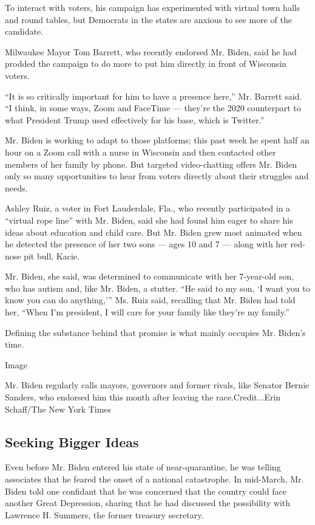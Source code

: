 To interact with voters, his campaign has experimented with virtual town
halls and round tables, but Democrats in the states are anxious to see
more of the candidate.

Milwaukee Mayor Tom Barrett, who recently endorsed Mr. Biden, said he
had prodded the campaign to do more to put him directly in front of
Wisconsin voters.

``It is so critically important for him to have a presence here,'' Mr.
Barrett said. ``I think, in some ways, Zoom and FaceTime --- they're the
2020 counterpart to what President Trump used effectively for his base,
which is Twitter.''

Mr. Biden is working to adapt to those platforms; this past week he
spent half an hour on a Zoom call with a nurse in Wisconsin and then
contacted other members of her family by phone. But targeted
video-chatting offers Mr. Biden only so many opportunities to hear from
voters directly about their struggles and needs.

Ashley Ruiz, a voter in Fort Lauderdale, Fla., who recently participated
in a ``virtual rope line'' with Mr. Biden, said she had found him eager
to share his ideas about education and child care. But Mr. Biden grew
most animated when he detected the presence of her two sons --- ages 10
and 7 --- along with her red-nose pit bull, Kacie.

Mr. Biden, she said, was determined to communicate with her 7-year-old
son, who has autism and, like Mr. Biden, a stutter. ``He said to my son,
`I want you to know you can do anything,''' Ms. Ruiz said, recalling
that Mr. Biden had told her, ``When I'm president, I will care for your
family like they're my family.''

Defining the substance behind that promise is what mainly occupies Mr.
Biden's time.

Image

Mr. Biden regularly calls mayors, governors and former rivals, like
Senator Bernie Sanders, who endorsed him this month after leaving the
race.Credit...Erin Schaff/The New York Times

\hypertarget{seeking-bigger-ideas}{%
\subsection{Seeking Bigger Ideas}\label{seeking-bigger-ideas}}

Even before Mr. Biden entered his state of near-quarantine, he was
telling associates that he feared the onset of a national catastrophe.
In mid-March, Mr. Biden told one confidant that he was concerned that
the country could face another Great Depression, sharing that he had
discussed the possibility with Lawrence H. Summers, the former treasury
secretary.

